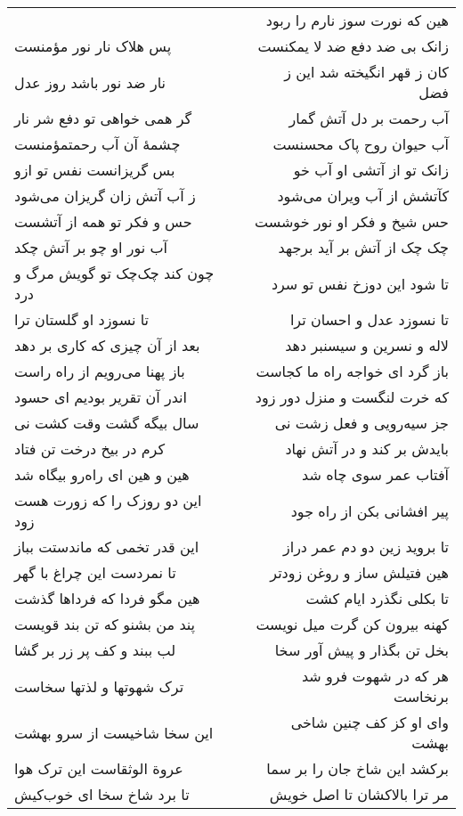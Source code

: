 \begin{center}
\begin{longtable}{l p{0.5cm} r}
&&
هین که نورت سوز نارم را ربود
\\
پس هلاک نار نور مؤمنست
&&
زانک بی ضد دفع ضد لا یمکنست
\\
نار ضد نور باشد روز عدل
&&
کان ز قهر انگیخته شد این ز فضل
\\
گر همی خواهی تو دفع شر نار
&&
آب رحمت بر دل آتش گمار
\\
چشمهٔ آن آب رحمتمؤمنست
&&
آب حیوان روح پاک محسنست
\\
بس گریزانست نفس تو ازو
&&
زانک تو از آتشی او آب خو
\\
ز آب آتش زان گریزان می‌شود
&&
کآتشش از آب ویران می‌شود
\\
حس و فکر تو همه از آتشست
&&
حس شیخ و فکر او نور خوشست
\\
آب نور او چو بر آتش چکد
&&
چک چک از آتش بر آید برجهد
\\
چون کند چک‌چک تو گویش مرگ و درد
&&
تا شود این دوزخ نفس تو سرد
\\
تا نسوزد او گلستان ترا
&&
تا نسوزد عدل و احسان ترا
\\
بعد از آن چیزی که کاری بر دهد
&&
لاله و نسرین و سیسنبر دهد
\\
باز پهنا می‌رویم از راه راست
&&
باز گرد ای خواجه راه ما کجاست
\\
اندر آن تقریر بودیم ای حسود
&&
که خرت لنگست و منزل دور زود
\\
سال بیگه گشت وقت کشت نی
&&
جز سیه‌رویی و فعل زشت نی
\\
کرم در بیخ درخت تن فتاد
&&
بایدش بر کند و در آتش نهاد
\\
هین و هین ای راه‌رو بیگاه شد
&&
آفتاب عمر سوی چاه شد
\\
این دو روزک را که زورت هست زود
&&
پیر افشانی بکن از راه جود
\\
این قدر تخمی که ماندستت بباز
&&
تا بروید زین دو دم عمر دراز
\\
تا نمردست این چراغ با گهر
&&
هین فتیلش ساز و روغن زودتر
\\
هین مگو فردا که فرداها گذشت
&&
تا بکلی نگذرد ایام کشت
\\
پند من بشنو که تن بند قویست
&&
کهنه بیرون کن گرت میل نویست
\\
لب ببند و کف پر زر بر گشا
&&
بخل تن بگذار و پیش آور سخا
\\
ترک شهوتها و لذتها سخاست
&&
هر که در شهوت فرو شد برنخاست
\\
این سخا شاخیست از سرو بهشت
&&
وای او کز کف چنین شاخی بهشت
\\
عروة الوثقاست این ترک هوا
&&
برکشد این شاخ جان را بر سما
\\
تا برد شاخ سخا ای خوب‌کیش
&&
مر ترا بالاکشان تا اصل خویش

\end{longtable}
\end{center}
